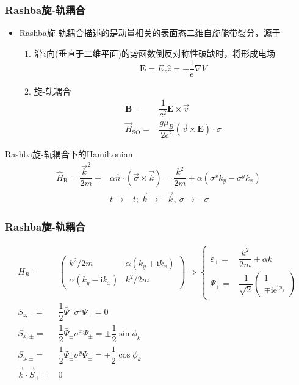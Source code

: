{\frame
{
	\frametitle{\textrm{Rashba}旋-轨耦合}
	\begin{itemize}
	\item \textrm{Rashba}旋-轨耦合描述的是动量相关的表面态二维自旋能带裂分，源于
		\begin{enumerate}
			\item 沿$\hat z$向(垂直于二维平面)的势函数倒反对称性破缺时，将形成电场
				\begin{displaymath}
					\mathbf E=E_z\hat z=-\dfrac1{e}\nabla V
				\end{displaymath}
			\item 旋-轨耦合
				\begin{displaymath}
					\begin{aligned}
						\mathbf B=&\dfrac1{c^2}\mathbf{E}\times\vec v\\
						\vec H_{\mathrm{SO}}=&\dfrac{g\mu_B}{2c^2}(\vec v\times\mathbf E)\cdot\sigma
					\end{aligned}
				\end{displaymath}
		\end{enumerate}
	\end{itemize}
	\textrm{Rashba}旋-轨耦合下的\textrm{Hamiltonian}
	\begin{displaymath}
		\begin{aligned}
		\hat H_{\mathrm R}=\dfrac{\vec k^2}{2m}+&\alpha\hat{n}\cdot(\vec\sigma\times\vec k)=\dfrac{k^2}{2m}+\alpha(\sigma^xk_y-\sigma^yk_x)\\
		&t\rightarrow-t;~\vec k\rightarrow-\vec k,~\sigma\rightarrow-\sigma
		\end{aligned}
	\end{displaymath}
}

\frame
{
	\frametitle{\textrm{Rashba}旋-轨耦合}
	\begin{displaymath}
		\begin{aligned}
		H_R=&
		\begin{pmatrix}
			k^2/2m &\alpha(k_y+\mathrm{i}k_x)\\
			\alpha(k_y-\mathrm{i}k_x) &k^2/2m
		\end{pmatrix}\Rightarrow\left\{
			\begin{aligned}
				\varepsilon_{\pm}=&\dfrac{k^2}{2m}\pm\alpha k\\
				\Psi_{\pm}=&\dfrac1{\sqrt2}
				\begin{pmatrix}
					1\\
					\mp\mathrm{ie}^{\mathrm{i}\phi_k}
				\end{pmatrix}
			\end{aligned}\right.\\
			S_{z,\pm}=&\dfrac12\bar{\Psi}_{\pm}\sigma^z\Psi_{\pm}=0\\ 
			S_{x,\pm}=&\dfrac12\bar{\Psi}_{\pm}\sigma^x\Psi_{\pm}=\pm\dfrac12\sin\phi_k\\
			S_{y,\pm}=&\dfrac12\bar{\Psi}_{\pm}\sigma^y\Psi_{\pm}=\mp\dfrac12\cos\phi_k\\
			\vec k\cdot\vec S_{\pm}=&0
		\end{aligned}
	\end{displaymath}
}

}
